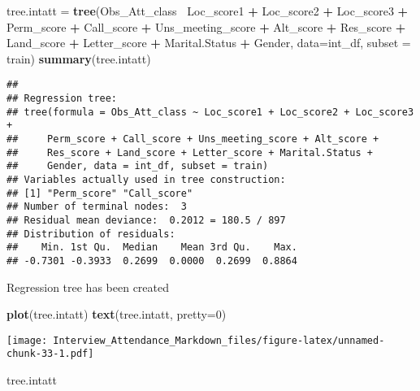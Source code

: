 \documentclass[]{article}
\newenvironment{Shaded}{\begin{snugshade}}{\end{snugshade}}
\newcommand{\KeywordTok}[1]{\textcolor[rgb]{0.13,0.29,0.53}{\textbf{#1}}}
\newcommand{\DataTypeTok}[1]{\textcolor[rgb]{0.13,0.29,0.53}{#1}}
\newcommand{\DecValTok}[1]{\textcolor[rgb]{0.00,0.00,0.81}{#1}}
\newcommand{\StringTok}[1]{\textcolor[rgb]{0.31,0.60,0.02}{#1}}
\newcommand{\OperatorTok}[1]{\textcolor[rgb]{0.81,0.36,0.00}{\textbf{#1}}}
\newcommand{\NormalTok}[1]{#1}
\begin{document}
\begin{Shaded}
\begin{Highlighting}[]
\NormalTok{tree.intatt =}\StringTok{ }\KeywordTok{tree}\NormalTok{(Obs_Att_class}\OperatorTok{~}\StringTok{ }\NormalTok{Loc_score1 }\OperatorTok{+}\StringTok{ }\NormalTok{Loc_score2 }\OperatorTok{+}\StringTok{ }\NormalTok{Loc_score3 }\OperatorTok{+}\StringTok{ }
\StringTok{                     }\NormalTok{Perm_score }\OperatorTok{+}\StringTok{ }\NormalTok{Call_score }\OperatorTok{+}\StringTok{ }\NormalTok{Uns_meeting_score }\OperatorTok{+}\StringTok{ }\NormalTok{Alt_score }\OperatorTok{+}
\StringTok{                     }\NormalTok{Res_score }\OperatorTok{+}\StringTok{ }\NormalTok{Land_score }\OperatorTok{+}\StringTok{ }\NormalTok{Letter_score }\OperatorTok{+}
\StringTok{                     }\NormalTok{Marital.Status }\OperatorTok{+}\StringTok{ }\NormalTok{Gender, }\DataTypeTok{data=}\NormalTok{int_df, }\DataTypeTok{subset =}\NormalTok{ train)}
\KeywordTok{summary}\NormalTok{(tree.intatt)}
\end{Highlighting}
\end{Shaded}

\begin{verbatim}
## 
## Regression tree:
## tree(formula = Obs_Att_class ~ Loc_score1 + Loc_score2 + Loc_score3 + 
##     Perm_score + Call_score + Uns_meeting_score + Alt_score + 
##     Res_score + Land_score + Letter_score + Marital.Status + 
##     Gender, data = int_df, subset = train)
## Variables actually used in tree construction:
## [1] "Perm_score" "Call_score"
## Number of terminal nodes:  3 
## Residual mean deviance:  0.2012 = 180.5 / 897 
## Distribution of residuals:
##    Min. 1st Qu.  Median    Mean 3rd Qu.    Max. 
## -0.7301 -0.3933  0.2699  0.0000  0.2699  0.8864
\end{verbatim}

Regression tree has been created

\begin{Shaded}
\begin{Highlighting}[]
\KeywordTok{plot}\NormalTok{(tree.intatt)}
\KeywordTok{text}\NormalTok{(tree.intatt, }\DataTypeTok{pretty=}\DecValTok{0}\NormalTok{)}
\end{Highlighting}
\end{Shaded}

\texttt{[image: Interview\_Attendance\_Markdown\_files/figure-latex/unnamed-chunk-33-1.pdf]}

\begin{Shaded}
\begin{Highlighting}[]
\NormalTok{tree.intatt}
\end{Highlighting}
\end{Shaded}
\end{document}
